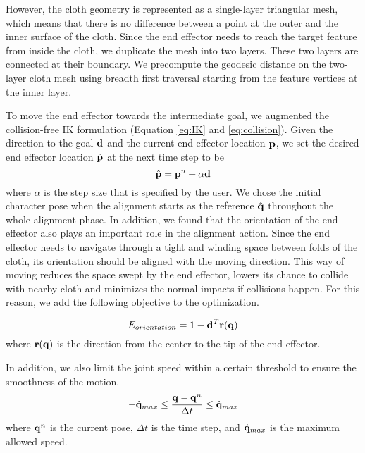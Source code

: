 However, the cloth geometry is represented as a single-layer triangular mesh, which means that there is no difference between a point at the outer and the inner surface of the cloth. Since the end effector needs to reach the target feature from inside the cloth, we duplicate the mesh into two layers. These two layers are connected at their boundary. We precompute the geodesic distance on the two-layer cloth mesh using breadth first traversal starting from the feature vertices at the inner layer.

To move the end effector towards the intermediate goal, we augmented the collision-free IK formulation (Equation \ref{eq:IK} and \ref{eq:collision}). Given the direction to the goal $\mathbf{d}$ and the current end effector location $\mathbf{p}$, we set the desired end effector location $\hat{\mathbf{p}}$ at the next time step to be
\begin{equation}
  \hat{\mathbf{p}} = \mathbf{p}^n+\alpha\mathbf{d}
  \label{eq:target}
\end{equation}
where $\alpha$ is the step size that is specified by the user.  We chose the initial character pose when the alignment starts as the reference $\hat{\mathbf{q}}$ throughout the whole alignment phase. In addition, we found that the orientation of the end effector also plays an important role in the alignment action. Since the end effector needs to navigate through a tight and winding space between folds of the cloth, its orientation should be aligned with the moving direction. This way of moving reduces the space swept by the end effector, lowers its chance to collide with nearby cloth and minimizes the normal impacts if collisions happen. For this reason, we add the following objective to the optimization.

\begin{equation}
  E_{orientation} = 1-\mathbf{d}^T\mathbf{r(q})
  \label{eq:orientation}
\end{equation}
where $\mathbf{r(q)}$ is the direction from the center to the tip of the end effector.

In addition, we also limit the joint speed within a certain threshold to ensure the smoothness of the motion.
\begin{equation}
  -\dot{\mathbf{q}}_{max} \leq \frac{\mathbf{q} - \mathbf{q}^n}{\Delta t} \leq \dot{\mathbf{q}}_{max}
  \label{eq:speed}
\end{equation}
where $\mathbf{q}^n$ is the current pose, $\Delta t$ is the time step, and $\dot{\mathbf{q}}_{max}$ is the maximum allowed speed.

